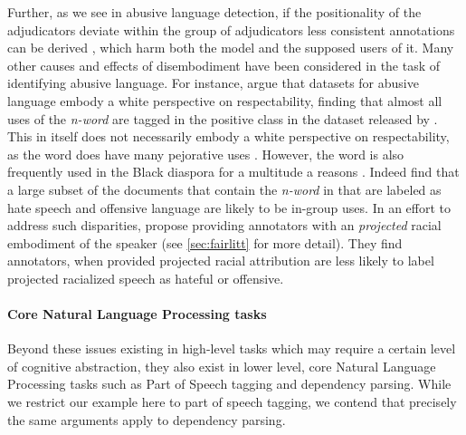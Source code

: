 Further, as we see in abusive language detection, if the positionality of the adjudicators deviate within the group of adjudicators less consistent annotations can be derived \cite{Waseem:2016}, which harm both the model and the supposed users of it. Many other causes and effects of disembodiment have been considered in the task of identifying abusive language. For instance, \citet{Waseem:2018} argue that datasets for abusive language embody a white perspective on respectability, finding that almost all uses of the \textit{n-word} are tagged in the positive class in the dataset released by \citet{Davidson:2017}. This in itself does not necessarily embody a white perspective on respectability, as the word does have many pejorative uses \cite{Croom:2013}. However, the word is also frequently used in the Black diaspora for a multitude a reasons \cite{Croom:2013,Rahman:2012}. Indeed \citet{Waseem:2018} find that a large subset of the documents that contain the \textit{n-word} in \citet{Davidson:2017} that are labeled as hate speech and offensive language are likely to be in-group uses. In an effort to address such disparities, \citet{Sap:2019} propose providing annotators with an \textit{projected} racial embodiment of the speaker (see \autoref{sec:fairlitt} for more detail). They find annotators, when provided projected racial attribution are less likely to label projected racialized speech as hateful or offensive.

\paragraph{Core Natural Language Processing tasks}
Beyond these issues existing in high-level tasks which may require a certain level of cognitive abstraction, they also exist in lower level, core Natural Language Processing tasks such as Part of Speech tagging and dependency parsing. While we restrict our example here to part of speech tagging, we contend that precisely the same arguments apply to dependency parsing.

